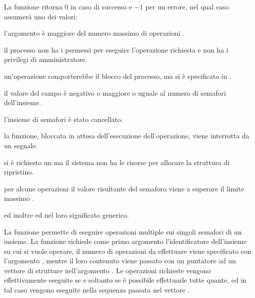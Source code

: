 \begin{funcproto}{
}

{La funzione ritorna $0$ in caso di successo e $-1$ per un errore, nel qual
  caso  assumerà uno dei valori: 
  \begin{errlist}
    \item[\errcode{E2BIG}] l'argomento  è maggiore del numero
      massimo di operazioni .
    \item[\errcode{EACCES}] il processo non ha i permessi per eseguire
      l'operazione richiesta e non ha i privilegi di amministratore.
    \item[\errcode{EAGAIN}] un'operazione comporterebbe il blocco del processo,
      ma si è specificato  in .
    \item[\errcode{EFBIG}] il valore del campo  è negativo o
      maggiore o uguale al numero di semafori dell'insieme.
    \item[\errcode{EIDRM}] l'insieme di semafori è stato cancellato.
    \item[\errcode{EINTR}] la funzione, bloccata in attesa dell'esecuzione
      dell'operazione, viene interrotta da un segnale.
    \item[\errcode{ENOMEM}] si è richiesto un  ma il sistema
      non ha le risorse per allocare la struttura di ripristino.
    \item[\errcode{ERANGE}] per alcune operazioni il valore risultante del
      semaforo viene a superare il limite massimo .
  \end{errlist}
  ed inoltre  ed  nel loro significato
  generico.}
\end{funcproto}

La funzione permette di eseguire operazioni multiple sui singoli semafori di
un insieme. La funzione richiede come primo argomento l'identificatore
 dell'insieme su cui si vuole operare, il numero di operazioni da
effettuare viene specificato con l'argomento , mentre il loro
contenuto viene passato con un puntatore ad un vettore di strutture
 nell'argomento . Le operazioni richieste vengono
effettivamente eseguite se e soltanto se è possibile effettuarle tutte quante,
ed in tal caso vengono eseguite nella sequenza passata nel
vettore .


